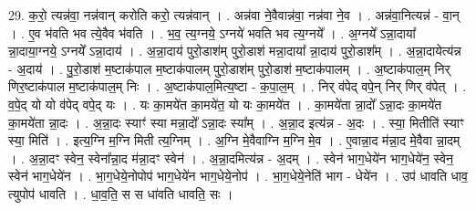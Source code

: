 \documentclass[17pt]{extarticle}
\begin{document}
29. क॒रो॒ त्यन्न॑वा॒ नन्न॑वान् करोति करो॒ त्यन्न॑वान् । . अन्न॑वा ने॒वैवान्न॑वा॒ नन्न॑वा ने॒व । . अन्न॑वा॒नित्यन्न॑ - वा॒न् । . ए॒व भ॑वति भव त्ये॒वैव भ॑वति । . भ॒व॒ त्य॒ग्नये॒ ऽग्नये॑ भवति भव त्य॒ग्नये᳚ । . अ॒ग्नये᳚ ऽन्ना॒दाया᳚ न्ना॒दाया॒ग्नये॒ ऽग्नये᳚ ऽन्ना॒दाय॑ । . अ॒न्ना॒दाय॑ पुरो॒डाश॑म् पुरो॒डाश॑ मन्ना॒दाया᳚ न्ना॒दाय॑ पुरो॒डाश᳚म् । . अ॒न्ना॒दायेत्य॑न्न - अ॒दाय॑ । . पु॒रो॒डाश॑ म॒ष्टाक॑पाल म॒ष्टाक॑पालम् पुरो॒डाश॑म् पुरो॒डाश॑ म॒ष्टाक॑पालम् । . अ॒ष्टाक॑पाल॒म् निर् णिर॒ष्टाक॑पाल म॒ष्टाक॑पाल॒म् निः । . अ॒ष्टाक॑पाल॒मित्य॒ष्टा - क॒पा॒ल॒म् । . निर् व॑पेद् वपे॒न् निर् णिर् व॑पेत् । . व॒पे॒द् यो यो व॑पेद् वपे॒द् यः । . यः का॒मये॑त का॒मये॑त॒ यो यः का॒मये॑त । . का॒मये॑ता न्ना॒दो᳚ ऽन्ना॒दः का॒मये॑त का॒मये॑ता न्ना॒दः । . अ॒न्ना॒दः स्याꣳ॑ स्या मन्ना॒दो᳚ ऽन्ना॒दः स्या᳚म् । . अ॒न्ना॒द इत्य॑न्न - अ॒दः । . स्या॒ मितीति॑ स्याꣳ स्या॒ मिति॑ । . इत्य॒ग्नि म॒ग्नि मिती त्य॒ग्निम् । . अ॒ग्नि मे॒वैवाग्नि म॒ग्नि मे॒व । . ए॒वान्ना॒द म॑न्ना॒द मे॒वैवा न्ना॒दम् । . अ॒न्ना॒दꣳ स्वेन॒ स्वेना᳚न्ना॒द म॑न्ना॒दꣳ स्वेन॑ । . अ॒न्ना॒दमित्य॑न्न - अ॒दम् । . स्वेन॑ भाग॒धेये॑न भाग॒धेये॑न॒ स्वेन॒ स्वेन॑ भाग॒धेये॑न । . भा॒ग॒धेये॒नोपोप॑ भाग॒धेये॑न भाग॒धेये॒नोप॑ । . भा॒ग॒धेये॒नेति॑ भाग - धेये॑न । . उप॑ धावति धाव॒ त्युपोप॑ धावति । . धा॒व॒ति॒ स स धा॑वति धावति॒ सः । \newline
\end{document}
